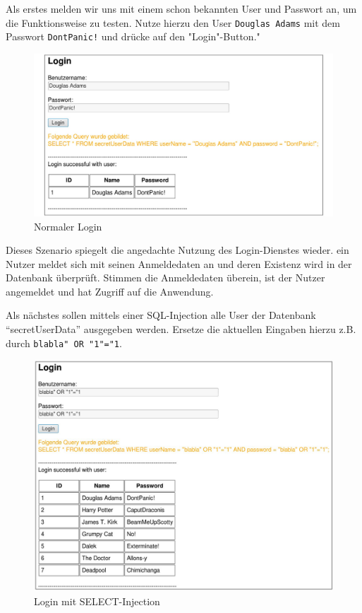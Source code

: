 Als erstes melden wir uns mit einem schon bekannten User und Passwort an, um die Funktionsweise zu testen. Nutze hierzu den User \colorbox{altgray}{\lstinline|Douglas Adams|} mit dem Passwort \colorbox{altgray}{\lstinline|DontPanic!|} und drücke auf den "Login"-Button."

\begin{figure}[H]
	\centering
	\includegraphics[width=\textwidth]{images/SQL_Injection/normal_login.jpg}
	\caption{Normaler Login}
	\label{fig:normal_login}
\end{figure}

Dieses Szenario spiegelt die angedachte Nutzung des Login-Dienstes wieder. ein Nutzer meldet sich mit seinen Anmeldedaten an und deren Existenz wird in der Datenbank überprüft. Stimmen die Anmeldedaten überein, ist der Nutzer angemeldet und hat Zugriff auf die Anwendung.

Als nächstes sollen mittels einer SQL-Injection alle User der Datenbank \enquote{secretUserData} ausgegeben werden. Ersetze die aktuellen Eingaben hierzu z.B. durch \colorbox{altgray}{\lstinline|blabla" OR "1"="1|}. 

\begin{figure}[H]
	\centering
	\includegraphics[width=\textwidth]{images/SQL_Injection/select_injection.jpg}
	\caption{Login mit SELECT-Injection}
	\label{fig:select_injection}
\end{figure}

